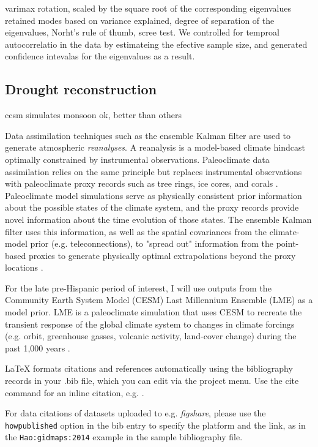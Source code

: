 \documentclass[fleqn,10pt]{wlscirep}
\begin{document}
varimax rotation, scaled by the square root of the corresponding eigenvalues
retained modes based on variance explained, degree of separation of the eigenvalues, Norht's rule of thumb, scree test. We controlled for temproal autocorrelatio in the data by estimateing the efective sample size, and generated confidence intevalas for the eigenvalues as a result.

\subsection*{Drought reconstruction}
ccsm simulates monsoon ok, better than others

Data assimilation techniques such as the ensemble Kalman filter are used to generate atmospheric \textit{reanalyses}. A reanalysis is a model-based climate hindcast optimally constrained by instrumental observations. Paleoclimate data assimilation relies on the same principle but replaces instrumental observations with paleoclimate proxy records such as tree rings, ice cores, and corals \cite{Hakim2016TheResults}. Paleoclimate model simulations serve as physically consistent prior information about the possible states of the climate system, and the proxy records provide novel information about the time evolution of those states. The ensemble Kalman filter uses this information, as well as the spatial covariances from the climate-model prior (e.g. teleconnections), to "spread out" information from the point-based proxies to generate physically optimal extrapolations beyond the proxy locations \cite{Acevedo2015TowardsTechniques,Hakim2016TheResults}.

For the late pre-Hispanic period of interest, I will use outputs from the Community Earth System Model (CESM) Last Millennium Ensemble (LME) as a model prior. LME is a paleoclimate simulation that uses CESM to recreate the transient response of the global climate system to changes in climate forcings (e.g. orbit, greenhouse gasses, volcanic activity, land-cover change) during the past 1,000 years \cite{Otto-bliesner2015}.




\noindent LaTeX formats citations and references automatically using the bibliography records in your .bib file, which you can edit via the project menu. Use the cite command for an inline citation, e.g.  \cite{Hao:gidmaps:2014}.

For data citations of datasets uploaded to e.g. \emph{figshare}, please use the \verb|howpublished| option in the bib entry to specify the platform and the link, as in the \verb|Hao:gidmaps:2014| example in the sample bibliography file.
\end{document}

